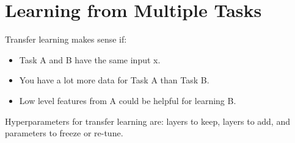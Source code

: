 \section{Learning from Multiple Tasks}

Transfer learning makes sense if:

\begin{itemize}[wide, labelwidth=!, labelindent=0pt]
\itemsep0em 
    \item Task A and B have the same input x.
    \item You have a lot more data for Task A than Task B.
    \item Low level features from A could be helpful for learning B. \vspace*{-\baselineskip}
\end{itemize}

Hyperparameters for transfer learning are: layers to keep, layers to add, and parameters to freeze or re-tune.
